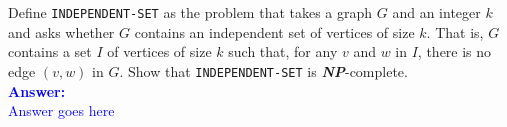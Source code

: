 \item{}
Define {\tt INDEPENDENT-SET} as the problem that takes a graph $G$ and an
integer $k$ and asks whether $G$ contains an independent set of vertices of
size $k$. That is, $G$ contains a set $I$ of vertices of size $k$ such that, for
any $v$ and $w$ in $I$, there is no edge $(v,w)$ in $G$. Show that
{\tt INDEPENDENT-SET} is \emph{\bf NP}-complete.\\[12pt]
\ifanswers
\textcolor{blue}{
\textbf{Answer:}\\[6pt]
Answer goes here
}
\newpage
\fi
